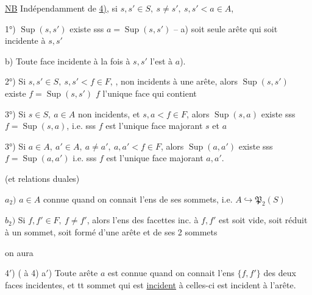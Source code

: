 \uline{NB} Indépendamment de \uline{4)}, si $s,s'\in S,\ s\ne s',\ s,s'<a\in A$, 

1°) $\operatorname{Sup}(s,s')$ existe sss $a=\operatorname{Sup}(s,s')$ --  a)  soit seule arête qui soit incidente à $s,s'$

b) Toute face incidente à la fois à $s,s'$ l'est à $a$).


2°) Si $s,s'\in S,\ s,s'<f\in F$, , non incidents à une  arête, alors $\operatorname{Sup}(s,s')$ existe \deleted{$\Longleftrightarrow$} $f=\operatorname{Sup}(s,s')$ \deleted{$\Longleftrightarrow$} $f$ l'unique face qui contient 

3°) Si $s\in S,\ a\in A$ non incidents, et $s,a<f\in F$, alors $\operatorname{Sup}(s,a)$ existe sss $f=\operatorname{Sup}(s,a)$,  i.e. sss $f$ est l'unique face majorant $s$ et $a$

3°) Si $a\in A,\ a'\in A,\ a\ne a',\ a,a'<f\in F$, alors $\operatorname{Sup}(a,a')$ existe sss $f=\operatorname{Sup}(a,a')$ i.e. sss $f$ est l'unique face majorant $a,a'$.

(et relations duales)

\diagram{\begin{tikzcd}[ampersand replacement=\&,column sep=small]
{}\arrow[d,dash,bend right=36,start anchor=west,end anchor=west]\&{}\\
{}\arrow[r,Leftrightarrow]\&{}\arrow[u,dash,bend right=24]
\end{tikzcd}}

$a_2)$ $a\in A$ connue quand on connait l'ens de ses sommets, i.e. $A\hookrightarrow\mathfrak P_2(S)$

$b_2)$ Si $f,f'\in F,\ f\ne f'$, alors l'ens des facettes inc. à $f,f'$ est soit vide, soit réduit à un sommet, soit formé d'une arête et de ses 2 sommets

on aura


4$'$) ( à 4) a$'$) Toute arête $a$ est connue quand on connait l'ens $\{f,f'\}$ des deux faces incidentes, et tt sommet qui est \uline{incident}  à celles-ci est incident à l'arête.

